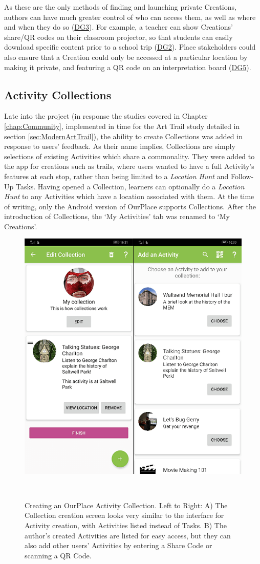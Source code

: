 As these are the only methods of finding and launching private Creations, authors can have much greater control of who can access them, as well as where and when they do so (\hyperref[DG3]{DG3}). For example, a teacher can show Creations' share/QR codes on their classroom projector, so that students can easily download specific content prior to a school trip (\hyperref[DG2]{DG2}). Place stakeholders could also ensure that a Creation could only be accessed at a particular location by making it private, and featuring a QR code on an interpretation board (\hyperref[DG5]{DG5}). 

\subsection{Activity Collections}
Late into the project (in response the studies covered in Chapter \ref{chap:Community}, implemented in time for the Art Trail study detailed in section \ref{sec:ModernArtTrail}), the ability to create Collections was added in response to users' feedback. As their name implies, Collections are simply selections of existing Activities which share a commonality. They were added to the app for creations such as trails, where users wanted to have a full Activity's features at each stop, rather than being limited to a \textit{Location Hunt} and Follow-Up Tasks. Having opened a Collection, learners can optionally do a \textit{Location Hunt} to any Activities which have a location associated with them. At the time of writing, only the Android version of OurPlace supports Collections. After the introduction of Collections, the `My Activities' tab was renamed to `My Creations'.

\begin{figure}
  \centering
  \includegraphics[width=0.5\columnwidth]{images/chapter05/CreateCollection.png}
  \caption[Creating an OurPlace Activity Collection]{Creating an OurPlace Activity Collection. Left to Right: A) The Collection creation screen looks very similar to the interface for Activity creation, with Activities listed instead of Tasks. B) The author's created Activities are listed for easy access, but they can also add other users' Activities by entering a Share Code or scanning a QR Code. }~\label{fig:CollectionCreation}
\end{figure}

